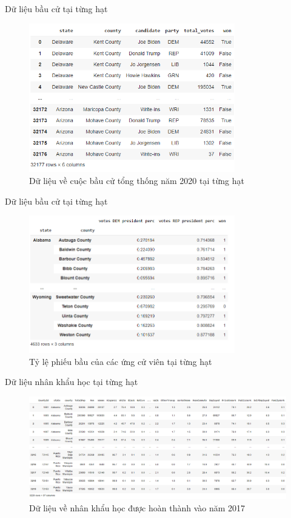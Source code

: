 \documentclass[10pt]{beamer}
\theoremstyle{remark}
\theoremstyle{definition}
\begin{document}
\begin{frame}{Dữ liệu bầu cử tại từng hạt}
	\begin{figure}[h!]
        \centering
        \includegraphics[width=0.8\textwidth]{figures/President_Dataframe.png}
        \caption{Dữ liệu về cuộc bầu cử tổng thống năm 2020 tại từng hạt}
    \end{figure}
\end{frame}

\begin{frame}{Dữ liệu bầu cử tại từng hạt}
	\begin{figure}[h!]
        \centering
        \includegraphics[width=0.8\textwidth]{figures/President_Dataframe_Rep_Dem_Percentage.png}
        \caption{Tỷ lệ phiếu bầu của các ứng cử viên tại từng hạt}
    \end{figure}
\end{frame}

\begin{frame}{Dữ liệu nhân khẩu học tại từng hạt}
	\begin{figure}[h!]
        \centering
        \includegraphics[width=\textwidth]{figures/Census_Dataframe.png}
        \caption{Dữ liệu về nhân khẩu học được hoàn thành vào năm 2017}
    \end{figure}
\end{frame}
\end{document}
